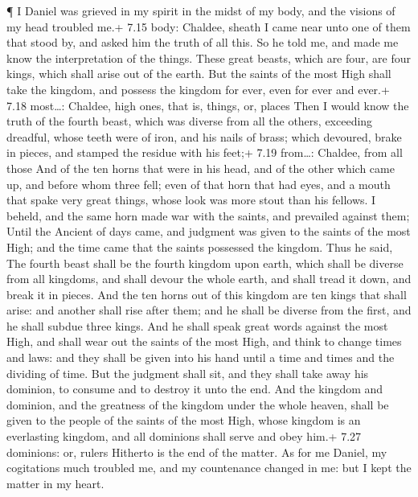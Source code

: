  ¶ I Daniel was grieved in my spirit in the midst of my
body, and the visions of my head troubled me.+ 7.15 body: Chaldee,
sheath  I came near unto one of them that stood by, and
asked him the truth of all this. So he told me, and made me know the
interpretation of the things.  These great beasts, which
are four, are four kings, which shall arise out of the earth.
 But the saints of the most High shall take the kingdom,
and possess the kingdom for ever, even for ever and ever.+ 7.18
most\ldots: Chaldee, high ones, that is, things, or, places
 Then I would know the truth of the fourth beast, which was
diverse from all the others, exceeding dreadful, whose teeth were of
iron, and his nails of brass; which devoured, brake in pieces, and
stamped the residue with his feet;+ 7.19 from\ldots: Chaldee, from all
those  And of the ten horns that were in his head, and of
the other which came up, and before whom three fell; even of that horn
that had eyes, and a mouth that spake very great things, whose look was
more stout than his fellows.  I beheld, and the same horn
made war with the saints, and prevailed against them; 
Until the Ancient of days came, and judgment was given to the saints of
the most High; and the time came that the saints possessed the kingdom.
 Thus he said, The fourth beast shall be the fourth kingdom
upon earth, which shall be diverse from all kingdoms, and shall devour
the whole earth, and shall tread it down, and break it in pieces.
 And the ten horns out of this kingdom are ten kings that
shall arise: and another shall rise after them; and he shall be diverse
from the first, and he shall subdue three kings.  And he
shall speak great words against the most High, and shall wear out the
saints of the most High, and think to change times and laws: and they
shall be given into his hand until a time and times and the dividing of
time.  But the judgment shall sit, and they shall take away
his dominion, to consume and to destroy it unto the end. 
And the kingdom and dominion, and the greatness of the kingdom under the
whole heaven, shall be given to the people of the saints of the most
High, whose kingdom is an everlasting kingdom, and all dominions shall
serve and obey him.+ 7.27 dominions: or, rulers  Hitherto
is the end of the matter. As for me Daniel, my cogitations much troubled
me, and my countenance changed in me: but I kept the matter in my heart.

